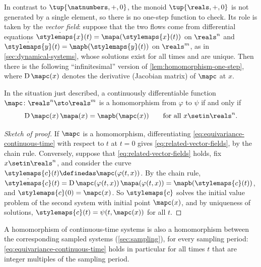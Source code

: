 In contrast to $\tup{\natnumbers, +, 0}$, the monoid $\tup{\reals, +, 0}$ is not generated by a single element, so there is no one-step function to check.
Its role is taken by the \emph{vector field}: suppose that the two flows come from differential equations $\dot{\stylemaps{x}}(t) = \mapa(\stylemaps{x}(t))$ on $\reals^n$ and $\dot{\stylemaps{y}}(t) = \mapb(\stylemaps{y}(t))$ on $\reals^m$, as in \cref{sec:dynamical-systems}, whose solutions exist for all times and are unique.
Then there is the following ``infinitesimal'' version of \cref{lem:homomorphism-one-step}, where $\operatorname{D}\mapc(x)$ denotes the derivative (Jacobian matrix) of $\mapc$ at $x$.

\begin{lemma}
    \label{lem:homomorphism-vector-fields}
    In the situation just described, a continuously differentiable function $\mapc \colon \reals^n \sto \reals^m$ is a homomorphism from $\varphi$ to $\psi$ if and only if
    \begin{equation}
        \label{eq:related-vector-fields}
        \operatorname{D}\mapc(x) \, \mapa(x) = \mapb(\mapc(x)) \qquad \text{for all } x \setin \reals^n.
    \end{equation}
\end{lemma}

\begin{proof}[Sketch of proof]
    If $\mapc$ is a homomorphism, differentiating \cref{eq:equivariance-continuous-time} with respect to $t$ at $t = 0$ gives \cref{eq:related-vector-fields}, by the chain rule.
    Conversely, suppose that \cref{eq:related-vector-fields} holds, fix $x \setin \reals^n$, and consider the curve $\stylemaps{c}(t) \definedas \mapc(\varphi(t, x))$.
    By the chain rule, $\dot{\stylemaps{c}}(t) = \operatorname{D}\mapc(\varphi(t, x)) \, \mapa(\varphi(t, x)) = \mapb(\stylemaps{c}(t))$, and $\stylemaps{c}(0) = \mapc(x)$.
    So $\stylemaps{c}$ solves the initial value problem of the second system with initial point $\mapc(x)$, and by uniqueness of solutions, $\stylemaps{c}(t) = \psi(t, \mapc(x))$ for all $t$.
\end{proof}

\begin{remark}
    \label{rem:homomorphism-sampling}
    A homomorphism of continuous-time systems is also a homomorphism between the corresponding sampled systems (\cref{sec:sampling}), for every sampling period: \cref{eq:equivariance-continuous-time} holds in particular for all times $t$ that are integer multiples of the sampling period.
\end{remark}

